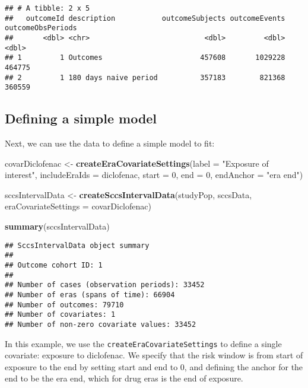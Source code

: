 \documentclass[
]{article}
\newenvironment{Shaded}{\begin{snugshade}}{\end{snugshade}}
\newcommand{\DataTypeTok}[1]{\textcolor[rgb]{0.13,0.29,0.53}{#1}}
\newcommand{\DecValTok}[1]{\textcolor[rgb]{0.00,0.00,0.81}{#1}}
\newcommand{\KeywordTok}[1]{\textcolor[rgb]{0.13,0.29,0.53}{\textbf{#1}}}
\newcommand{\NormalTok}[1]{#1}
\newcommand{\StringTok}[1]{\textcolor[rgb]{0.31,0.60,0.02}{#1}}
\begin{document}
\begin{verbatim}
## # A tibble: 2 x 5
##   outcomeId description           outcomeSubjects outcomeEvents outcomeObsPeriods
##       <dbl> <chr>                           <dbl>         <dbl>             <dbl>
## 1         1 Outcomes                       457608       1029228            464775
## 2         1 180 days naive period          357183        821368            360559
\end{verbatim}

\hypertarget{defining-a-simple-model}{%
\subsection{Defining a simple model}\label{defining-a-simple-model}}

Next, we can use the data to define a simple model to fit:

\begin{Shaded}
\begin{Highlighting}[]
\NormalTok{covarDiclofenac <-}\StringTok{ }\KeywordTok{createEraCovariateSettings}\NormalTok{(}\DataTypeTok{label =} \StringTok{"Exposure of interest"}\NormalTok{,}
                                              \DataTypeTok{includeEraIds =}\NormalTok{ diclofenac,}
                                              \DataTypeTok{start =} \DecValTok{0}\NormalTok{,}
                                              \DataTypeTok{end =} \DecValTok{0}\NormalTok{,}
                                              \DataTypeTok{endAnchor =} \StringTok{"era end"}\NormalTok{)}

\NormalTok{sccsIntervalData <-}\StringTok{ }\KeywordTok{createSccsIntervalData}\NormalTok{(studyPop,}
\NormalTok{                                           sccsData,}
                                           \DataTypeTok{eraCovariateSettings =}\NormalTok{ covarDiclofenac)}

\KeywordTok{summary}\NormalTok{(sccsIntervalData)}
\end{Highlighting}
\end{Shaded}

\begin{verbatim}
## SccsIntervalData object summary
## 
## Outcome cohort ID: 1
## 
## Number of cases (observation periods): 33452
## Number of eras (spans of time): 66904
## Number of outcomes: 79710
## Number of covariates: 1
## Number of non-zero covariate values: 33452
\end{verbatim}

In this example, we use the \texttt{createEraCovariateSettings} to
define a single covariate: exposure to diclofenac. We specify that the
risk window is from start of exposure to the end by setting start and
end to 0, and defining the anchor for the end to be the era end, which
for drug eras is the end of exposure.
\end{document}
